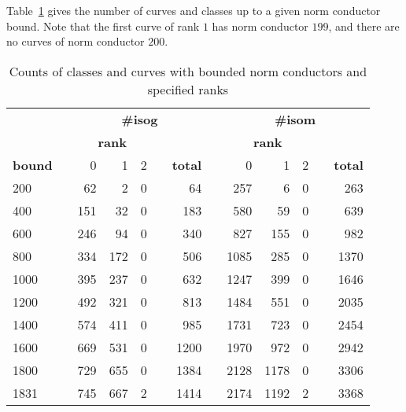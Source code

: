 \documentclass{amsart}
\begin{document}
Table~\ref{table:increasing-counts} gives the number of curves and classes
up to a given norm conductor bound. Note that the first curve of rank $1$ has
norm conductor $199$, and there are no curves of norm conductor $200$.
\begin{center}
\begin{table}[h]
\caption{Counts of classes and curves with bounded norm conductors and specified ranks\label{table:increasing-counts}}
\begin{tabular}{@{}lcrrrcrcrrrcr@{}}\toprule
& \phantom{a} & \multicolumn{5}{c}{\textbf{\#isog}}                  & \phantom{ab} & \multicolumn{5}{c}{\textbf{\#isom}}                  \\\cmidrule{3-7}\cmidrule{9-13}
&             & \multicolumn{3}{c}{\textbf{rank}} & &                &              & \multicolumn{3}{c}{\textbf{rank}} & &                \\\cmidrule{3-5}\cmidrule{9-11}
\textbf{bound} &              & 0 & 1 & 2          & & \textbf{total} &              & 0 & 1 & 2                         & & \textbf{total} \\\midrule
200  & & 62  & 2   & 0 & & 64   & & 257  & 6    & 0 & & 263  \\
400  & & 151 & 32  & 0 & & 183  & & 580  & 59   & 0 & & 639  \\
600  & & 246 & 94  & 0 & & 340  & & 827  & 155  & 0 & & 982  \\
800  & & 334 & 172 & 0 & & 506  & & 1085 & 285  & 0 & & 1370 \\
1000 & & 395 & 237 & 0 & & 632  & & 1247 & 399  & 0 & & 1646 \\
1200 & & 492 & 321 & 0 & & 813  & & 1484 & 551  & 0 & & 2035 \\
1400 & & 574 & 411 & 0 & & 985  & & 1731 & 723  & 0 & & 2454 \\
1600 & & 669 & 531 & 0 & & 1200 & & 1970 & 972  & 0 & & 2942 \\
1800 & & 729 & 655 & 0 & & 1384 & & 2128 & 1178 & 0 & & 3306 \\
1831 & & 745 & 667 & 2 & & 1414 & & 2174 & 1192 & 2 & & 3368 \\\bottomrule
\end{tabular}
\end{table}
\end{center}
\end{document}
